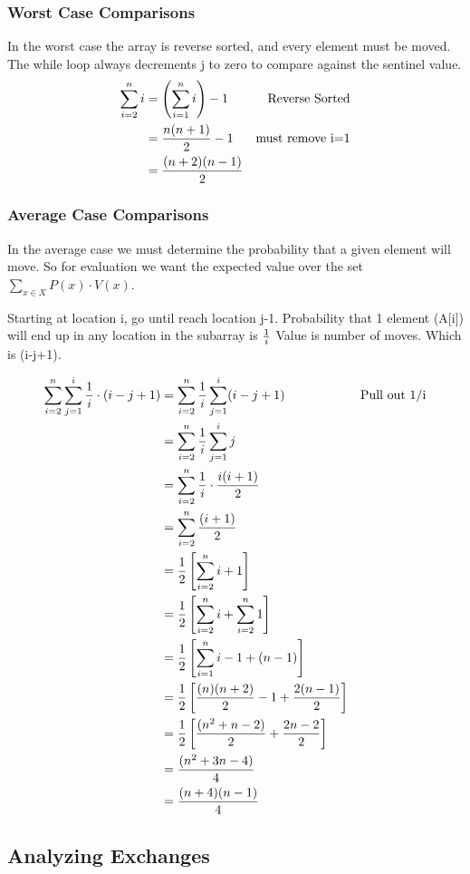 \documentclass[english, 10pt]{article}
\begin{document}
\subsubsection{Worst Case Comparisons}
In the worst case the array is reverse sorted, and every element must be moved.
The while loop always decrements j to zero to compare against the sentinel value.
\begin{align*}
    \sum_{i=2}^n i &= \left(\sum_{i=1}^{n}i \right)-1 & \text{Reverse Sorted} \\
    &= \frac{n(n+1)}{2} -1 & \text{must remove i=1} \\
    &= \frac{(n+2)(n-1)}{2}
\end{align*}

\subsubsection{Average Case Comparisons}
In the average case we must determine the probability that a given element will move.
So for evaluation we want the expected value over the set $\sum_{x \in X} P(x)\cdot V(x) $.

Starting at location i, go until reach location j-1.
Probability that 1 element (A[i]) will end up in any location in the subarray is $\frac{1}{i}$
Value is number of moves. Which is (i-j+1).

\begin{align*}
    \sum_{i=2}^{n} \sum_{j=1}^{i} \frac{1}{i} \cdot (i-j+1) &= \sum_{i=2}^{n} \frac{1}{i} \sum_{j=1}^{i} (i-j+1)  &  \text{Pull out 1/i} \\
 &= \sum_{i=2}^{n}\frac{1}{i}\sum_{j=1}^{i} j \\
 &= \sum_{i=2}^{n}\frac{1}{i}\cdot\frac{i(i+1)}{2} \\
 &= \sum_{i=2}^{n}\frac{(i+1)}{2} \\
 &= \frac{1}{2}\left[ \sum_{i=2}^{n}i+1\right] \\
 &= \frac{1}{2}\left[ \sum_{i=2}^{n}i+ \sum_{i=2}^{n}1\right] \\
 &= \frac{1}{2}\left[ \sum_{i=1}^{n}i -1 + (n-1) \right] \\
 &= \frac{1}{2}\left[ \frac{(n)(n+2)}{2} -1 + \frac{2(n-1)}{2} \right] \\
 &= \frac{1}{2}\left[ \frac{(n^2+n-2)}{2} + \frac{2n-2}{2} \right] \\
 &= \frac{(n^2+3n-4)}{4}  \\
 &= \frac{(n+4) (n-1)}{4}
\end{align*}


\subsection{Analyzing Exchanges}
\end{document}
